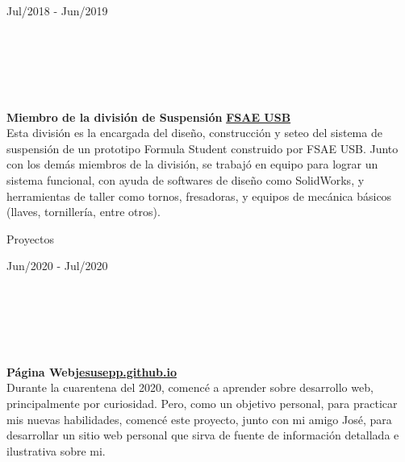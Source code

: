 \documentclass[10pt]{article}
\begin{document}
\begin{vwcol}[widths={0.235,0.765},
 sep=.8cm, rule=0pt,indent=0em,lines=6]
    \hspace{5pt}Jul/2018 - Jun/2019\par
    \hfill\\
    \hfill\\
    \hfill\\
    \hfill\\
    \hfill\\
    \textbf{Miembro de la división de Suspensión}
    \hfill
    \href{http://fsaeusb.com.ve/}{\color{blue!50!black}\textbf{FSAE USB}}\\
    \vspace{5pt}
    Esta división es la encargada del diseño, construcción y seteo del sistema de suspensión de un prototipo Formula Student construido por FSAE USB. Junto con los demás miembros de la división, se trabajó en equipo para lograr un sistema funcional, con ayuda de softwares de diseño como SolidWorks, y herramientas de taller como tornos, fresadoras, y equipos de mecánica básicos (llaves, tornillería, entre otros).\par
\end{vwcol}

\begin{LARGE}
    \color{blue!50!black} Proyectos\par
\end{LARGE}

\begin{vwcol}[widths={0.235,0.765},
 sep=.8cm, rule=0pt,indent=0em,lines=6] 
\hspace{5pt}Jun/2020 - Jul/2020\par
    \hfill\\
    \hfill\\
    \hfill\\
    \hfill\\
    \hfill\\
    \textbf{Página Web}\hfill \href{https://jesusepp.github.io/}{\color{blue!50!black}\textbf{jesusepp.github.io}}\\
    \vspace{5pt}
    Durante la cuarentena del 2020, comencé a aprender sobre desarrollo web, principalmente por curiosidad. Pero, como un objetivo personal, para practicar mis nuevas habilidades, comencé este proyecto, junto con mi amigo José, para desarrollar un sitio web personal que sirva de fuente de información detallada e ilustrativa sobre mi.\par
\end{vwcol}
\end{document}
